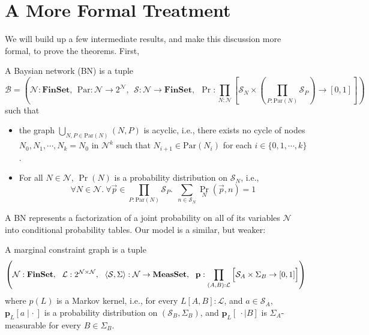 \documentclass{article}
\begin{document}
	\section{A More Formal Treatment}
	
	We will build up a few intermediate results, and make this discussion more formal, to prove the theorems. First,
	
	\begin{defn}
		A Baysian network (BN) is a tuple
		\[
			\mathcal B = \left(\mathcal N : \mathbf{FinSet}, ~~\mathrm{Par}: \mathcal N \to 2^{\mathcal N},~~ \mathcal S: \mathcal N \to \mathbf{FinSet},~~\Pr: \prod_{N : \mathcal N}  \left[ \mathcal S_N \times \left(\prod_{P : \mathrm{Par}(N)} \mathcal S_P\right)  \to [0,1] \right] \right)
		\]
		such that
		\begin{itemize}[nosep]
			\item the graph $\bigcup_{N, P \in \mathrm{Par}(N)}(N, P)$ is acyclic, i.e., there exists no cycle of nodes $N_0, N_1, \cdots, N_k = N_0$ in $\mathcal N^k$ such that $N_{i+1} \in \mathrm{Par}(N_i)$ for each $i \in \{0, 1, \cdots, k\}$.
			\item For all $N \in \mathcal N$, $\Pr(N)$ is a probability distribution on $\mathcal S_N$, i.e., 
			\[ \forall N\in \mathcal N.~\forall \vec{p} \in {\prod_{P : \mathrm{Par}(N)} \mathcal S_P}.~~ \sum_{n \in \mathcal S_{N}} \Pr_N(\vec{p}, n) = 1\]
		\end{itemize}
	\end{defn}

	A BN represents a factorization of a joint probability on all of its variables $\mathcal N$ into conditional probability tables. Our model is a similar, but weaker:

	\begin{defn}\label{def:mcg}
		A marginal constraint graph is a tuple 
		\[ \left(\mathcal N : \mathbf{FinSet},~~\mathcal L : 2^{\cal N \times N},~~ \langle\mathcal S, \Sigma\rangle : \mathcal N \to \mathbf{MeasSet}, ~~\mathbf p : \prod_{(A,B): \mathcal L} \left[ \Big. \mathcal S_A \times \Sigma_B \to [0,1]\right] \right) \]
		where $p(L)$ is a Markov kernel, i.e., for every $L[A,B] : \mathcal L$, and $a \in \mathcal S_A$, $\mathbf p_L[a \mid \cdot~]$ is a probability distribution on $(\mathcal S_B, \Sigma_B)$, and $\mathbf p_L[~\cdot \mid B]$ is $\Sigma_A$-measurable for every $B \in \Sigma_B$.
	\end{defn}
\end{document}
